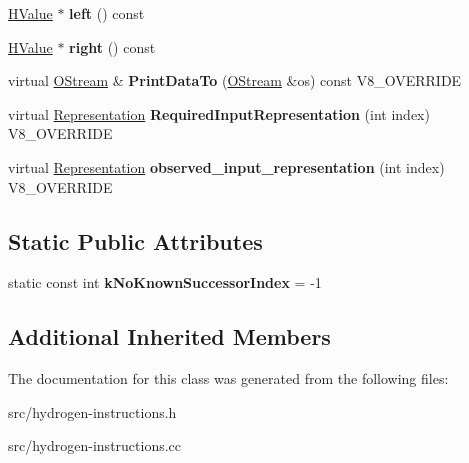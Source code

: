 \begin{DoxyCompactItemize}
\item 
\hypertarget{classv8_1_1internal_1_1_h_compare_object_eq_and_branch_ab147ef5fc035e98b47bb22707d262366}{}\hyperlink{classv8_1_1internal_1_1_h_value}{H\+Value} $\ast$ {\bfseries left} () const \label{classv8_1_1internal_1_1_h_compare_object_eq_and_branch_ab147ef5fc035e98b47bb22707d262366}

\item 
\hypertarget{classv8_1_1internal_1_1_h_compare_object_eq_and_branch_a228710cccc67f3401d2658b02f2738a3}{}\hyperlink{classv8_1_1internal_1_1_h_value}{H\+Value} $\ast$ {\bfseries right} () const \label{classv8_1_1internal_1_1_h_compare_object_eq_and_branch_a228710cccc67f3401d2658b02f2738a3}

\item 
\hypertarget{classv8_1_1internal_1_1_h_compare_object_eq_and_branch_a93387c0302870c82a919bdc210a58df7}{}virtual \hyperlink{classv8_1_1internal_1_1_o_stream}{O\+Stream} \& {\bfseries Print\+Data\+To} (\hyperlink{classv8_1_1internal_1_1_o_stream}{O\+Stream} \&os) const V8\+\_\+\+O\+V\+E\+R\+R\+I\+D\+E\label{classv8_1_1internal_1_1_h_compare_object_eq_and_branch_a93387c0302870c82a919bdc210a58df7}

\item 
\hypertarget{classv8_1_1internal_1_1_h_compare_object_eq_and_branch_a5ee8641027b6645ee9fbdd0e93f8fddd}{}virtual \hyperlink{classv8_1_1internal_1_1_representation}{Representation} {\bfseries Required\+Input\+Representation} (int index) V8\+\_\+\+O\+V\+E\+R\+R\+I\+D\+E\label{classv8_1_1internal_1_1_h_compare_object_eq_and_branch_a5ee8641027b6645ee9fbdd0e93f8fddd}

\item 
\hypertarget{classv8_1_1internal_1_1_h_compare_object_eq_and_branch_aba56601c2f42f252fadbe7ffb0452ea1}{}virtual \hyperlink{classv8_1_1internal_1_1_representation}{Representation} {\bfseries observed\+\_\+input\+\_\+representation} (int index) V8\+\_\+\+O\+V\+E\+R\+R\+I\+D\+E\label{classv8_1_1internal_1_1_h_compare_object_eq_and_branch_aba56601c2f42f252fadbe7ffb0452ea1}

\end{DoxyCompactItemize}
\subsection*{Static Public Attributes}
\begin{DoxyCompactItemize}
\item 
\hypertarget{classv8_1_1internal_1_1_h_compare_object_eq_and_branch_a6def7a4539c92dbad898bf79976cc2ee}{}static const int {\bfseries k\+No\+Known\+Successor\+Index} = -\/1\label{classv8_1_1internal_1_1_h_compare_object_eq_and_branch_a6def7a4539c92dbad898bf79976cc2ee}

\end{DoxyCompactItemize}
\subsection*{Additional Inherited Members}


The documentation for this class was generated from the following files\+:\begin{DoxyCompactItemize}
\item 
src/hydrogen-\/instructions.\+h\item 
src/hydrogen-\/instructions.\+cc\end{DoxyCompactItemize}
